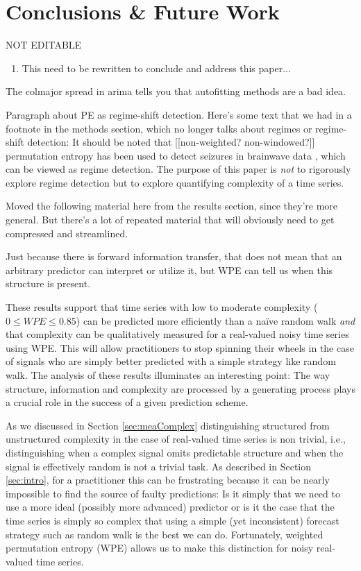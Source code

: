 \section{ Conclusions \& Future Work }\label{sec:conc}
{\color{red} NOT EDITABLE}
\begin{enumerate}
\item  This need to be rewritten to conclude and address this paper...
\end{enumerate}

The colmajor spread in arima tells you that autofitting methods are a
bad idea.

Paragraph about PE as regime-shift detection.  Here's some text that
we had in a footnote in the methods section, which no longer talks
about regimes or regime-shift detection: It should be noted that
[[non-weighted?  non-windowed?]]  permutation entropy has been used to
detect seizures in brainwave data \cite{cao2004det}, which can be
viewed as regime detection.  The purpose of this paper is \emph{not}
to rigorously explore regime detection but to explore quantifying
complexity of a time series.

Moved the following material here from the results section, since
they're more general.  But there's a lot of repeated material that
will obviously need to get compressed and streamlined.

Just because there is forward information transfer, that does not mean
that an arbitrary predictor can interpret or utilize it, but WPE can
tell us when this structure is present.

These results support that time series with low to moderate complexity
($0\le WPE \le 0.85$) can be predicted more efficiently than a na\"ive
random walk \emph{and} that complexity can be qualitatively measured
for a real-valued noisy time series using WPE. This will allow
practitioners to stop spinning their wheels in the case of signals who
are simply better predicted with a simple strategy like random
walk. The analysis of these results illuminates an interesting point:
The way structure, information and complexity are processed by a
generating process plays a crucial role in the success of a given
prediction scheme.

As we discussed in Section \ref{sec:meaComplex} distinguishing
structured from unstructured complexity in the case of real-valued
time series is non trivial, i.e., distinguishing when a complex signal
omits predictable structure and when the signal is effectively random
is not a trivial task. As described in Section \ref{sec:intro}, for a
practitioner this can be frustrating because it can be nearly
impossible to find the source of faulty predictions: Is it simply that
we need to use a more ideal (possibly more advanced) predictor or is
it the case that the time series is simply so complex that using a
simple (yet inconsistent) forecast strategy such as random walk is the
best we can do. Fortunately, weighted permutation entropy (WPE) allows
us to make this distinction for noisy real-valued time series.

